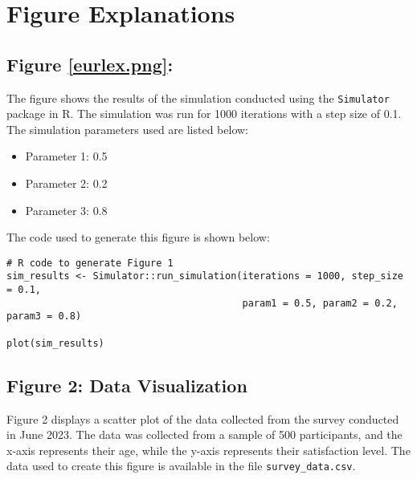 
\appendix
\chapter{Figure Explanations}
\label{app:figure_explanation}

\section{Figure \ref{eurlex.png}:}
The figure shows the results of the simulation conducted using the \texttt{Simulator} package in \textsf{R}. The simulation was run for 1000 iterations with a step size of 0.1. The simulation parameters used are listed below:

\begin{itemize}
  \item Parameter 1: 0.5
  \item Parameter 2: 0.2
  \item Parameter 3: 0.8
\end{itemize}

The code used to generate this figure is shown below:

\begin{verbatim}
# R code to generate Figure 1
sim_results <- Simulator::run_simulation(iterations = 1000, step_size = 0.1,
                                         param1 = 0.5, param2 = 0.2, param3 = 0.8)

plot(sim_results)
\end{verbatim}

\section{Figure 2: Data Visualization}
Figure 2 displays a scatter plot of the data collected from the survey conducted in June 2023. The data was collected from a sample of 500 participants, and the x-axis represents their age, while the y-axis represents their satisfaction level. The data used to create this figure is available in the file \texttt{survey_data.csv}.

